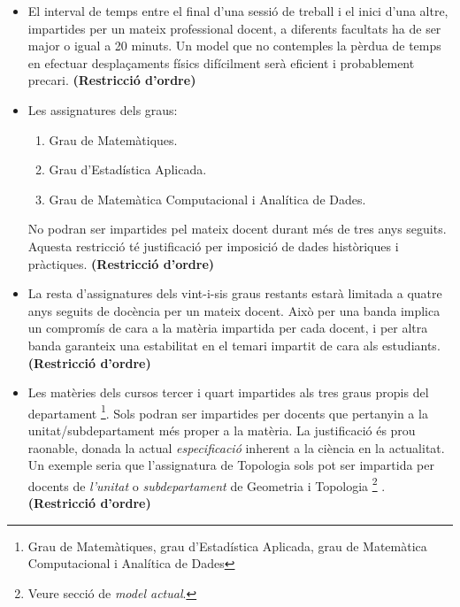 \documentclass[10pt,twocolumn]{article}
\begin{document}
\begin{enumerate}
\begin{itemize}
		\item El interval de temps entre el final d'una sessió de treball i el inici d'una altre, impartides per un mateix professional docent, a diferents facultats ha de ser major o igual a 20 minuts. {\color{gray} Un model que no contemples la pèrdua de temps en efectuar desplaçaments físics difícilment serà eficient i probablement precari.} \textbf{(Restricció d'ordre)} 
		\item Les assignatures dels graus:
		\begin{enumerate} 
			\item Grau de Matemàtiques.
			\item Grau d'Estadística Aplicada.
			\item Grau de Matemàtica Computacional i Analítica de Dades.
		\end{enumerate}
		No podran ser impartides pel mateix docent durant més de tres anys seguits.
		{\color{gray} Aquesta restricció té justificació per imposició de dades històriques i pràctiques.} \textbf{(Restricció d'ordre)} 
		\item La resta d'assignatures dels vint-i-sis graus restants estarà limitada a quatre anys seguits de docència per un mateix docent. {\color{gray} Això per una banda implica un compromís de cara a la matèria impartida per cada docent, i per altra banda garanteix una estabilitat en el temari impartit de cara als estudiants.} \textbf{(Restricció d'ordre)} 
		\item  Les matèries  dels cursos tercer i quart impartides als tres graus propis del departament \footnote{Grau de Matemàtiques, grau d'Estadística Aplicada, grau de Matemàtica Computacional i Analítica de Dades}. Sols podran ser impartides per docents que pertanyin a la unitat/subdepartament més proper a la matèria.   {\color{gray} La justificació és prou raonable, donada la actual \textit{especificació} inherent a la ciència en la actualitat. Un exemple seria que l'assignatura de Topologia sols pot ser impartida per docents de \textit{l'unitat} o \textit{subdepartament} de Geometria i Topologia \footnote{Veure secció de  \textit{model actual}.} .} \textbf{(Restricció d'ordre)} 
	\end{itemize}
\end{enumerate}								
\footnotesize


\end{document}
